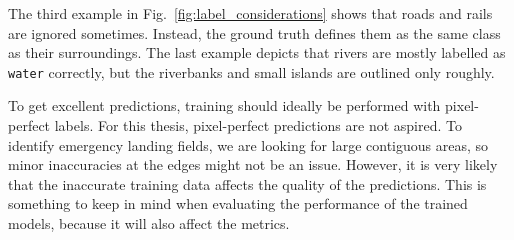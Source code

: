 The third example in Fig.~\ref{fig:label_considerations} shows that roads and rails are ignored sometimes. Instead, the ground truth defines them as the same class as their surroundings. The last example depicts that rivers are mostly labelled as \texttt{water} correctly, but the riverbanks and small islands are outlined only roughly.

To get excellent predictions, training should ideally be performed with pixel-perfect labels. For this thesis, pixel-perfect predictions are not aspired. To identify emergency landing fields, we are looking for large contiguous areas, so minor inaccuracies at the edges might not be an issue. However, it is very likely that the inaccurate training data affects the quality of the predictions. This is something to keep in mind when evaluating the performance of the trained models, because it will also affect the metrics.

\clearpage
